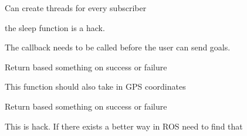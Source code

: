 
\begin{DoxyRefList}
\item[\label{todo__todo000001}%
\hypertarget{todo__todo000001}{}%
\-Member \hyperlink{classspiri__api_1_1camera_1_1camera__interface_aa01883759da88698cfa72cb7988167c7}{spiri\-\_\-api.camera.camera\-\_\-interface.callback\-\_\-threading} ]\-Can create threads for every subscriber  
\item[\label{todo__todo000002}%
\hypertarget{todo__todo000002}{}%
\-Member \hyperlink{classspiri__api_1_1camera_1_1camera__interface_aa218b82e6e2135a1c0e7011edc9889cf}{spiri\-\_\-api.camera.camera\-\_\-interface.save\-\_\-left\-\_\-video} ]the sleep function is a hack. 
\item[\label{todo__todo000003}%
\hypertarget{todo__todo000003}{}%
\-Member \hyperlink{classspiri__api_1_1get__state_1_1_staterobot_a015efa1f3a59211063e167ec0cb1fc3b}{spiri\-\_\-api.get\-\_\-state.\-Staterobot.\-\_\-\-\_\-init\-\_\-\-\_\-} ]\-The callback needs to be called before the user can send goals. 
\item[\label{todo__todo000004}%
\hypertarget{todo__todo000004}{}%
\-Member \hyperlink{classspiri__api_1_1get__state_1_1_staterobot_af6d1fe436714134bbd2fb78da0b09835}{spiri\-\_\-api.get\-\_\-state.\-Staterobot.send\-\_\-goal} ]\-Return based something on success or failure 

\-This function should also take in \-G\-P\-S coordinates  
\item[\label{todo__todo000005}%
\hypertarget{todo__todo000005}{}%
\-Member \hyperlink{classspiri__api_1_1get__state_1_1_staterobot_abc35e5157bb27bfc35bbfb4aee9df2e5}{spiri\-\_\-api.get\-\_\-state.\-Staterobot.send\-\_\-goal\-\_\-relative\-\_\-threading} ]\-Return based something on success or failure  
\item[\label{todo__todo000006}%
\hypertarget{todo__todo000006}{}%
\-Member \hyperlink{class_staterobot_addfc245d53239eed664812a50a916428}{\-Staterobot\-:\-:send\-\_\-vel} (float x, float y, float z)]\-This is hack. \-If there exists a better way in \-R\-O\-S need to find that 
\end{DoxyRefList}
